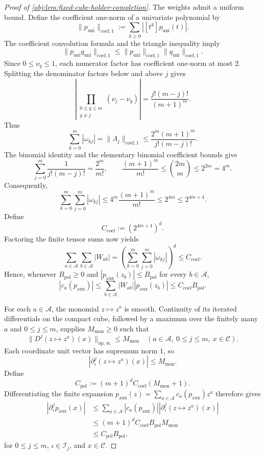 \documentclass[11pt]{article}
\begin{document}
\begin{proof}[Proof of \cref{obj:lem:fixed-cube-holder-completion}]
The weights admit a uniform bound. Define the coefficient one-norm of a univariate polynomial by
\[
\|p_{\mathrm{uni}}\|_{\mathrm{coef},1}
:=
\sum_{k\ge0}|[t^k]p_{\mathrm{uni}}(t)|.
\]
The coefficient convolution formula and the triangle inequality imply
\[
\|p_{\mathrm{uni}}q_{\mathrm{uni}}\|_{\mathrm{coef},1}
\le
\|p_{\mathrm{uni}}\|_{\mathrm{coef},1}
\|q_{\mathrm{uni}}\|_{\mathrm{coef},1}.
\]
Since \(0\le\nu_q\le1\), each numerator factor has coefficient one-norm at most \(2\). Splitting the denominator factors below and above \(j\) gives
\[
\left|
\prod_{\substack{0\le q\le m\\q\ne j}}(\nu_j-\nu_q)
\right|
=
\frac{j!(m-j)!}{(m+1)^m}.
\]
Thus
\[
\sum_{k=0}^m|\omega_{kj}|
=
\|\Lambda_j\|_{\mathrm{coef},1}
\le
\frac{2^m(m+1)^m}{j!(m-j)!}.
\]
The binomial identity and the elementary binomial coefficient bounds give
\[
\sum_{j=0}^m\frac{1}{j!(m-j)!}
=\frac{2^m}{m!},
\qquad
\frac{(m+1)^m}{m!}
\le\binom{2m}{m}\le 2^{2m}=4^m.
\]
Consequently,
\[
\sum_{k=0}^m\sum_{j=0}^m|\omega_{kj}|
\le
4^m\frac{(m+1)^m}{m!}
\le 2^{4m}
\le 2^{4m+4}.
\]
Define
\[
C_{\mathrm{coef}}:=(2^{4m+4})^d.
\]
Factoring the finite tensor sums now yields
\[
\sum_{a\in\mathscr A}\sum_{b\in\mathscr A}|W_{ab}|
=
\left(\sum_{k=0}^m\sum_{j=0}^m|\omega_{kj}|\right)^d
\le C_{\mathrm{coef}}.
\]
Hence, whenever \(B_{\mathrm{pol}}\ge0\) and
\(|p_{\mathrm{aux}}(z_b)|\le B_{\mathrm{pol}}\) for every \(b\in\mathscr A\),
\[
|c_a(p_{\mathrm{aux}})|
\le
\sum_{b\in\mathscr A}|W_{ab}|
|p_{\mathrm{aux}}(z_b)|
\le C_{\mathrm{coef}}B_{\mathrm{pol}}.
\]

For each \(a\in\mathscr A\), the monomial \(z\mapsto z^a\) is smooth. Continuity of its iterated differentials on the compact cube, followed by a maximum over the finitely many \(a\) and \(0\le j\le m\), supplies \(M_{\mathrm{mon}}\ge0\) such that
\[
\|D^j(z\mapsto z^a)(x)\|_{\mathrm{op},\infty}
\le M_{\mathrm{mon}}
\quad(a\in\mathscr A,\ 0\le j\le m,\ x\in\mathscr C).
\]
Each coordinate unit vector has supremum norm \(1\), so
\[
|\partial_\iota^j(z\mapsto z^a)(x)|
\le M_{\mathrm{mon}}.
\]
Define
\[
C_{\mathrm{pol}}
:=
(m+1)^d C_{\mathrm{coef}}(M_{\mathrm{mon}}+1).
\]
Differentiating the finite expansion
\(p_{\mathrm{aux}}(z)=\sum_{a\in\mathscr A}c_a(p_{\mathrm{aux}})z^a\)
therefore gives
\[
\begin{aligned}
|\partial_\iota^j p_{\mathrm{aux}}(x)|
&\le
\sum_{a\in\mathscr A}|c_a(p_{\mathrm{aux}})|
|\partial_\iota^j(z\mapsto z^a)(x)|\\
&\le (m+1)^d C_{\mathrm{coef}}B_{\mathrm{pol}}M_{\mathrm{mon}}\\
&\le C_{\mathrm{pol}}B_{\mathrm{pol}},
\end{aligned}
\]
for \(0\le j\le m\), \(\iota\in\mathscr I_j\), and \(x\in\mathscr C\).


\end{proof}
\end{document}
